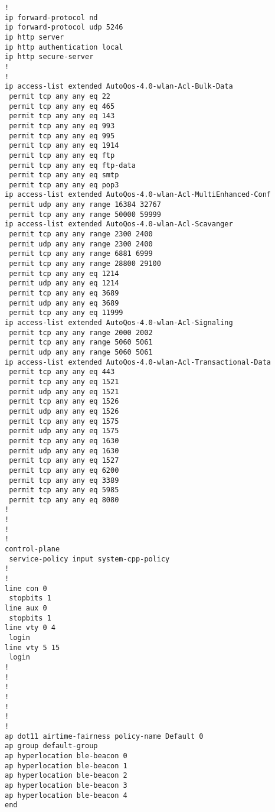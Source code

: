 \begin{verbatim}
!
ip forward-protocol nd
ip forward-protocol udp 5246
ip http server
ip http authentication local
ip http secure-server
!
!
ip access-list extended AutoQos-4.0-wlan-Acl-Bulk-Data
 permit tcp any any eq 22
 permit tcp any any eq 465
 permit tcp any any eq 143
 permit tcp any any eq 993
 permit tcp any any eq 995
 permit tcp any any eq 1914
 permit tcp any any eq ftp
 permit tcp any any eq ftp-data
 permit tcp any any eq smtp
 permit tcp any any eq pop3
ip access-list extended AutoQos-4.0-wlan-Acl-MultiEnhanced-Conf
 permit udp any any range 16384 32767
 permit tcp any any range 50000 59999
ip access-list extended AutoQos-4.0-wlan-Acl-Scavanger
 permit tcp any any range 2300 2400
 permit udp any any range 2300 2400
 permit tcp any any range 6881 6999
 permit tcp any any range 28800 29100
 permit tcp any any eq 1214
 permit udp any any eq 1214
 permit tcp any any eq 3689
 permit udp any any eq 3689
 permit tcp any any eq 11999
ip access-list extended AutoQos-4.0-wlan-Acl-Signaling
 permit tcp any any range 2000 2002
 permit tcp any any range 5060 5061
 permit udp any any range 5060 5061
ip access-list extended AutoQos-4.0-wlan-Acl-Transactional-Data
 permit tcp any any eq 443
 permit tcp any any eq 1521
 permit udp any any eq 1521
 permit tcp any any eq 1526
 permit udp any any eq 1526
 permit tcp any any eq 1575
 permit udp any any eq 1575
 permit tcp any any eq 1630
 permit udp any any eq 1630
 permit tcp any any eq 1527
 permit tcp any any eq 6200
 permit tcp any any eq 3389
 permit tcp any any eq 5985
 permit tcp any any eq 8080
!
!
!
!
control-plane
 service-policy input system-cpp-policy
!
!
line con 0
 stopbits 1
line aux 0
 stopbits 1
line vty 0 4
 login
line vty 5 15
 login
!
!
!
!
!
!
!
ap dot11 airtime-fairness policy-name Default 0
ap group default-group
ap hyperlocation ble-beacon 0
ap hyperlocation ble-beacon 1
ap hyperlocation ble-beacon 2
ap hyperlocation ble-beacon 3
ap hyperlocation ble-beacon 4
end

\end{verbatim}


\clearpage
